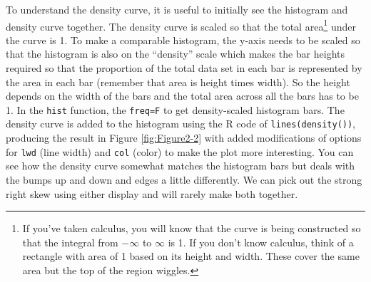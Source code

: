 \documentclass[]{book}
\newenvironment{Shaded}{\begin{snugshade}}{\end{snugshade}}
\newcommand{\KeywordTok}[1]{\textcolor[rgb]{0.13,0.29,0.53}{\textbf{#1}}}
\newcommand{\DataTypeTok}[1]{\textcolor[rgb]{0.13,0.29,0.53}{#1}}
\newcommand{\DecValTok}[1]{\textcolor[rgb]{0.00,0.00,0.81}{#1}}
\newcommand{\StringTok}[1]{\textcolor[rgb]{0.31,0.60,0.02}{#1}}
\newcommand{\OperatorTok}[1]{\textcolor[rgb]{0.81,0.36,0.00}{\textbf{#1}}}
\newcommand{\NormalTok}[1]{#1}
\let\rmarkdownfootnote\footnote%
\def\footnote{\protect\rmarkdownfootnote}
\begin{document}
To understand the density curve, it is useful to initially see the
histogram and density curve together. The density curve is scaled so
that the total area\footnote{If you've taken calculus, you will know
  that the curve is being constructed so that the integral from
  \(-\infty\) to \(\infty\) is 1. If you don't know calculus, think of a
  rectangle with area of 1 based on its height and width. These cover
  the same area but the top of the region wiggles.} under the curve is
1. To make a comparable histogram, the y-axis needs to be scaled so that
the histogram is also on the ``density'' scale which makes the bar
heights required so that the proportion of the total data set in each
bar is represented by the area in each bar (remember that area is height
times width). So the height depends on the width of the bars and the
total area across all the bars has to be 1. In the \texttt{hist}
function, the \texttt{freq=F} to get density-scaled histogram bars. The
density curve is added to the histogram using the R code of
\texttt{lines(density())}, producing the result in Figure
\ref{fig:Figure2-2} with added modifications of options for \texttt{lwd}
(line width) and \texttt{col} (color) to make the plot more interesting.
You can see how the density curve somewhat matches the histogram bars
but deals with the bumps up and down and edges a little differently. We
can pick out the strong right skew using either display and will rarely
make both together.



\begin{Shaded}
\end{Shaded}
\end{document}
